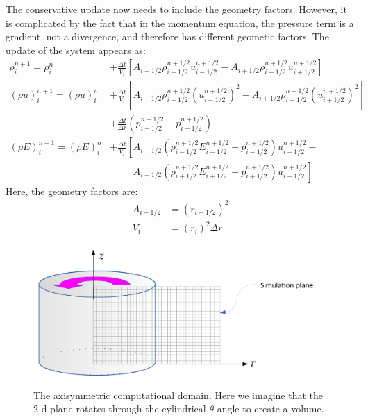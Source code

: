 The conservative update now needs to include the geometry factors.  However,
it is complicated by the fact that in the momentum equation, the pressure 
term is a gradient, not a divergence, and therefore has different 
geometic factors.  The update of the system appears as:
\begin{align}
\rho^{n+1}_i = \rho^n_i &+ \frac{\Delta t}{V_i} 
   \left [A_{i-1/2} \rho_{i-1/2}^{n+1/2} u_{i-1/2}^{n+1/2} - 
          A_{i+1/2} \rho_{i+1/2}^{n+1/2} u_{i+1/2}^{n+1/2} \right ] \\
(\rho u)^{n+1}_i = (\rho u)^n_i &+ \frac{\Delta t}{V_i} 
   \left [ A_{i-1/2} \rho_{i-1/2}^{n+1/2} (u_{i-1/2}^{n+1/2})^2  - 
           A_{i+1/2} \rho_{i+1/2}^{n+1/2} (u_{i+1/2}^{n+1/2})^2  \right ]\nonumber \\
        & + \frac{\Delta t}{\Delta r} \left ( p_{i-1/2}^{n+1/2} - 
                                              p_{i+1/2}^{n+1/2} \right ) \\
(\rho E)^{n+1}_i = (\rho E)^n_i &+ \frac{\Delta t}{V_i} 
   \left [ A_{i-1/2} \left (\rho_{i-1/2}^{n+1/2} E_{i-1/2}^{n+1/2}  + p_{i-1/2}^{n+1/2} \right ) u_{i-1/2}^{n+1/2} - \right . \nonumber \\
   &\phantom{+ \frac{\Delta t}{V_i} \left[ \right.}   \left .   A_{i+1/2} \left (\rho_{i+1/2}^{n+1/2} E_{i+1/2}^{n+1/2}  + p_{i+1/2}^{n+1/2} \right ) u_{i+1/2}^{n+1/2} \right ]
\end{align}
Here, the geometry factors are:
\begin{align}
A_{i-1/2} &= (r_{i-1/2})^2\\
V_i &= (r_i)^2 \Delta r
\end{align}

\begin{figure}
\centering
\includegraphics[width=0.8\linewidth]{axisymmetry}
\caption[The axisymmetric computational domain]
{\label{fig:axisymmetri} The axisymmetric computational domain.  Here we
  imagine that the 2-d plane rotates through the cylindrical $\theta$ angle to
  create a volume.}
\end{figure}

